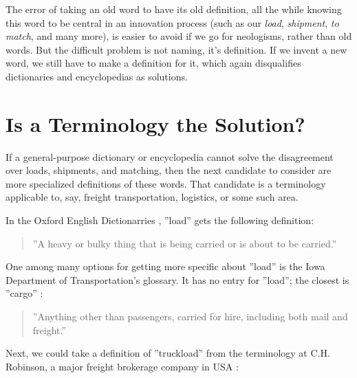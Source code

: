 \documentclass[graybox,envcountchap,sectrefs]{svmono}
\begin{document}
The error of taking an old word to have its old definition, all the while knowing this word to be central in an innovation process (such as our \textit{load}, \textit{shipment}, \textit{to match}, and many more), is easier to avoid if we go for neologisms, rather than old words. But the difficult problem is not naming, it's definition. If we invent a new word, we still have to make a definition for it, which again disqualifies dictionaries and encyclopedias as solutions. 


\section{Is a Terminology the Solution?}\label{s:terminology-1}
If a general-purpose dictionary or encyclopedia cannot solve the disagreement over loads, shipments, and matching, then the next candidate to consider are more specialized definitions of these words. That candidate is a terminology applicable to, say, freight transportation, logistics, or some such area.

In the Oxford English Dictionarries \cite{oed-load}, ''load'' gets the following definition:

\begin{quote}
    ''A heavy or bulky thing that is being carried or is about to be carried.''
\end{quote}

One among many options for getting more specific about ''load'' is the Iowa Department of Transportation's glossary. It has no entry for ''load''; the closest is ''cargo'' \cite{iowa-dot-cargo}:

\begin{quote}
    ''Anything other than passengers, carried for hire, including both mail and freight.''
\end{quote}

Next, we could take a definition of ''truckload'' from the terminology at C.H. Robinson, a major freight brokerage company in USA \cite{chrobinson-truckload}:
\end{document}
